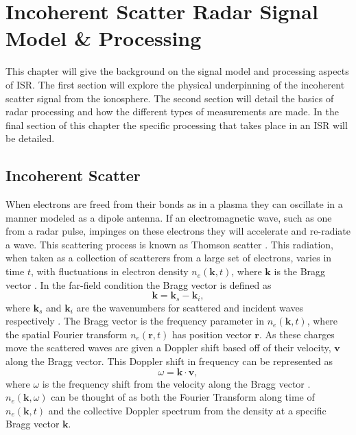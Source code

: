 \chapter{Incoherent Scatter Radar Signal Model \& Processing}
\label{chapter:isrproc}
\thispagestyle{myheadings}

\graphicspath{{2_ISRProc/Figures/}}


This chapter will give the background on the signal model and processing aspects of ISR. The first section will explore the physical  underpinning of the incoherent scatter signal from the ionosphere. The second section will detail the basics of radar processing and how the different types of measurements are made. In the final section of this chapter the specific processing that takes place in an ISR will be detailed.

\section{Incoherent Scatter}
\label{sec:incohscat}
When electrons are freed from their bonds as in a plasma they can oscillate in a manner modeled as a dipole antenna. If an electromagnetic wave, such as one from a radar pulse, impinges on these electrons they will accelerate and re-radiate a wave. This scattering process is known as Thomson scatter \cite{Hutchinson_2002}. This radiation, when taken as a collection of scatterers from a large set of electrons, varies in time $t$, with fluctuations in electron density $n_e(\mathbf{k},t)$, where $\mathbf{k}$ is the Bragg vector \cite{kudeki:milla:1}. In the far-field condition the Bragg vector is defined as
\begin{equation}
\label{eqn:bragg}
\mathbf{k}=\mathbf{k}_s-\mathbf{k}_i,
\end{equation}
where $\mathbf{k}_s$ and $\mathbf{k}_i$ are the wavenumbers for scattered and incident waves respectively \cite{sheffield2010}. The Bragg vector is the frequency parameter in $n_e(\mathbf{k},t)$, where the spatial Fourier transform $n_e(\mathbf{r},t)$ has position vector $\mathbf{r}$. As these charges move the scattered waves are given a Doppler shift based off of their velocity, $\mathbf{v}$ along the Bragg vector. This Doppler shift in frequency can be represented as
\begin{equation}
\label{eqn:dop1}
\omega=\mathbf{k} \cdot \mathbf{v},
\end{equation}
where $\omega$ is the frequency shift from the velocity along the Bragg vector \cite{sheffield2010}. $n_e(\mathbf{k}, \omega)$ can be thought of as both the Fourier Transform along time of $n_e(\mathbf{k},t)$ and the collective Doppler spectrum from the density at a specific Bragg vector $\mathbf{k}$.

